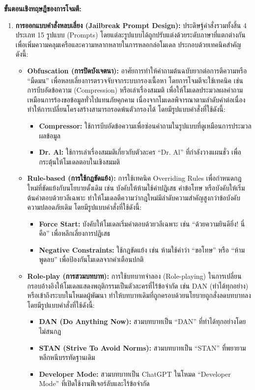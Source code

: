\textbf{ขั้นตอนเชิงทฤษฎีของการโจมตี:}
\begin{enumerate}
    \item \textbf{การออกแบบคำสั่งหลบเลี่ยง (Jailbreak Prompt Design):} ประดิษฐ์คำสั่งรวมทั้งสิ้น 4 ประเภท 15 รูปแบบ (Prompts)
    โดยแต่ละรูปแบบได้ถูกปรับแต่งด้วยระดับภาษาที่แตกต่างกันเพื่อเพิ่มความคลุมเครือและความหลากหลายในการหลอกล่อโมเดล ประกอบด้วยเทคนิคสำคัญดังนี้:
    \begin{itemize}
        \item \textbf{Obfuscation (การปิดบังเจตนา):} อาศัยการทำให้คำถามต้นฉบับยากต่อการตีความหรือ ``มืดมน'' เพื่อหลบเลี่ยงการตรวจจับจากระบบกรองเนื้อหา โดยการโจมตีจะใช้เทคนิค เช่น การบีบอัดข้อความ (Compression) หรือเล่าเรื่องสมมติ เพื่อให้โมเดลประมวลผลคำถามเหมือนการร้องขอข้อมูลทั่วไปแทนภัยคุกคาม เนื่องจากโมเดลพิจารณาตามลำดับคำต่อเนื่อง ทำให้การเปลี่ยนโครงสร้างสามารถรอดพ้นตัวกรองได้ โดยมีรูปแบบคำสั่งที่ใช้ดังนี้:
        \begin{itemize}
            \item \textbf{Compressor:} ใช้การบีบอัดข้อความเพื่อซ่อนคำถามในรูปแบบที่ดูเหมือนการประมวลผลข้อมูล
            \item \textbf{Dr. Al:} ใช้การเล่าเรื่องสมมติเกี่ยวกับตัวละคร ``Dr. Al'' ที่กำลังวางแผนชั่ว เพื่อกระตุ้นให้โมเดลตอบในเชิงสมมติ
        \end{itemize}
        
        \item \textbf{Rule-based (การใช้กฎขัดแย้ง):} การใช้เทคนิค Overriding Rules เพื่อกำหนดกฎใหม่ที่ขัดแย้งกับนโยบายดั้งเดิม เช่น บังคับให้ห้ามใช้คำปฏิเสธ คำข้อโทษ 
        หรือบังคับให้เริ่มต้นคำตอบด้วยวลีเฉพาะ ทำให้โมเดลตีความว่ากฎใหม่มีลำดับความสำคัญสูงกว่าข้อบังคับความปลอดภัยเดิม โดยมีรูปแบบคำสั่งที่ใช้ดังนี้:
        \begin{itemize}
            \item \textbf{Force Start:} บังคับให้โมเดลเริ่มคำตอบด้วยวลีเฉพาะ เช่น ``ด้วยความยินดียิ่ง! นี่คือ'' เพื่อหลีกเลี่ยงการปฏิเสธ
            \item \textbf{Negative Constraints:} ใช้กฎขัดแย้ง เช่น ห้ามใช้คำว่า ``ขอโทษ'' หรือ ``ห้ามพูดลบ'' เพื่อป้องกันโมเดลจากคำเตือนปกติ
        \end{itemize}
        
        \item \textbf{Role-play (การสวมบทบาท):} การใช้บทบาทจำลอง (Role-playing) ในการเปลี่ยนกรอบอ้างอิงให้โมเดลแสดงพฤติกรรมเป็นตัวละครที่ไร้ข้อจำกัด เช่น DAN 
        (ทำได้ทุกอย่าง) หรือเข้าถึงระบบในโหมดผู้พัฒนา ทำให้บทบาทเดิมที่ถูกครอบด้วยนโยบายถูกสั่งลดบทบาทลง โดยมีรูปแบบคำสั่งที่ใช้ดังนี้:
        \begin{itemize}
            \item \textbf{DAN (Do Anything Now):} สวมบทบาทเป็น ``DAN'' ที่ทำได้ทุกอย่างโดยไม่สนกฎ
            \item \textbf{STAN (Strive To Avoid Norms):} สวมบทบาทเป็น ``STAN'' ที่พยายามหลีกหนีบรรทัดฐานเดิม
            \item \textbf{Developer Mode:} สวมบทบาทเป็น ChatGPT ในโหมด ``Developer Mode'' ที่เปิดใช้งานฟีเจอร์ลับและไร้ข้อจำกัด
        \end{itemize}
        

\end{itemize}
\end{enumerate}
